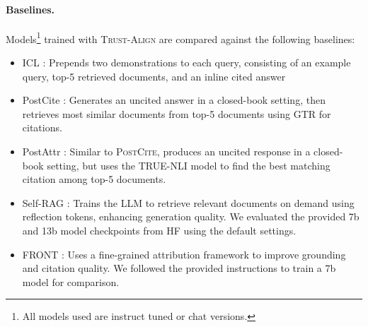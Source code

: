 \documentclass{article} %
\renewcommand{\cite}[1]{\citep{#1}}
\newcommand{\method}[0]{\textsc{Trust-Align}}
\begin{document}
\paragraph{Baselines.}
Models\footnote{All models used are instruct tuned or chat versions.} trained with \method{} are compared against the following baselines:
\begin{itemize}[leftmargin=*, topsep=0pt]
    \setlength\itemsep{0.1cm}
    \setlength\parskip{0cm}
    \item ICL \cite{gao2023enabling}: Prepends two demonstrations to each query, consisting of an example query, top-5 retrieved documents, and an inline cited answer
    
    \item PostCite \cite{gao2023enabling}: Generates an uncited answer in a closed-book setting, then retrieves most similar documents from top-5  documents using GTR for citations.
    
    \item PostAttr \cite{gao2023enabling}: Similar to \textsc{PostCite}, produces an uncited response in a closed-book setting, but uses the TRUE-NLI model to find the best matching citation among top-5  documents.
    
    \item Self-RAG \cite{asai2024selfrag}: Trains the LLM to retrieve relevant documents on demand using reflection tokens, enhancing generation quality. We evaluated the provided 7b and 13b model checkpoints from HF using the default settings.
    
    \item FRONT \cite{huang-etal-2024-learning}: Uses a fine-grained attribution framework to improve grounding and citation quality. We followed the provided instructions to train a 7b model for comparison.
\end{itemize}

\end{document}
